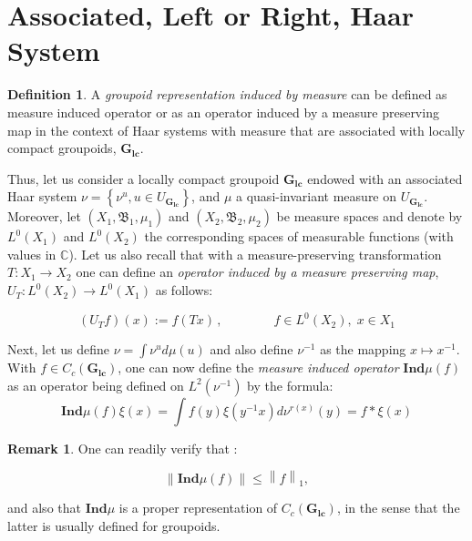 \documentclass[12pt]{article}
\theoremstyle{plain}
\theoremstyle{definition}
\newtheorem{definition}{Definition}[section]
\newtheorem{remark}{Remark}[section]
\numberwithin{equation}{section}
\begin{document}
\section{Associated, Left or Right, Haar System}

\begin{definition}
A \emph{groupoid representation induced by measure} can be defined as measure induced operator
or as an operator induced by a measure preserving map in the context of Haar systems with measure that are
associated with locally compact groupoids, $\mathbf{G_{lc}}$. 

  Thus, let us consider a locally compact groupoid 
$\mathbf{G_{lc}}$ endowed with an associated Haar system 
$\nu = \left\{\nu^u, u \in U_{\mathbf{G_{lc}}} \right\}$, and $\mu$
a quasi-invariant measure on $U_{\mathbf{G_{lc}}}$. 
Moreover, let $(X_1, \mathfrak{B}_1, \mu_1)$ and $(X_2, \mathfrak{B}_2, \mu_2)$ be measure spaces and denote by $L^0(X_1)$ and $L^0(X_2)$ the corresponding spaces of measurable functions (with values in $\mathbb{C}$). Let us also recall that with a measure-preserving transformation $T: X_1 \longrightarrow X_2$ one can define an \emph{operator induced by a measure preserving map},  $U_T:L^0(X_2) \longrightarrow L^0(X_1)$ as follows:

\begin{displaymath}
(U_T f)(x):=f(Tx)\,, \qquad\qquad f \in L^0(X_2),\; x \in X_1
\end{displaymath}

 Next, let us define $\nu = \int \nu^u d\mu (u)$ and also define $\nu^{-1}$ as the mapping 
$x \mapsto  x^{-1}$. With $f \in C_c(\mathbf{G_{lc}})$, one can now define the 
\emph{measure induced operator} $\textbf{Ind}\mu (f) $ as an operator being defined on $L^2(\nu^{-1})$
by the formula: 
$$\textbf{Ind}\mu (f)\xi(x)= \int f(y) \xi(y^{-1}x)d\nu^{r(x)}(y) = f * \xi(x) $$
\end{definition}

\begin{remark}

One can readily verify that :

$$\left\| \textbf{Ind}\mu(f) \right\|  \leq  \left\| f \right\|_1 ,$$ 

and also that $\textbf{Ind}\mu$ is a proper representation of $C_c(\mathbf{G_{lc}})$, in the sense that the latter is usually defined for groupoids.
\end{remark}

\end{document}
